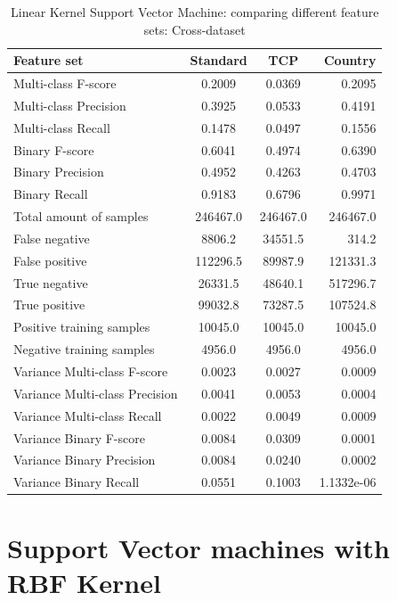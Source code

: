 \begin{table}[H]
\caption{Linear Kernel Support Vector Machine: comparing different feature sets: Cross-dataset}
\label{tab:linsvm:cross}
\centering
\begin{tabular}{l c c r}
\toprule
Feature set & Standard & TCP & Country \\
\midrule
Multi-class F-score & 0.2009 & 0.0369 & 0.2095 \\
Multi-class Precision & 0.3925 & 0.0533 & 0.4191 \\
Multi-class Recall & 0.1478 & 0.0497 & 0.1556 \\
\midrule
Binary F-score & 0.6041 & 0.4974 & 0.6390 \\
Binary Precision & 0.4952 & 0.4263 & 0.4703 \\
Binary Recall & 0.9183 & 0.6796 & 0.9971 \\
\midrule
Total amount of samples & 246467.0 & 246467.0 & 246467.0 \\
False negative & 8806.2  & 34551.5 & 314.2\\
False positive & 112296.5 & 89987.9 & 121331.3 \\
True negative & 26331.5 & 48640.1 & 517296.7 \\
True positive & 99032.8 & 73287.5 & 107524.8 \\
\midrule
Positive training samples & 10045.0 & 10045.0 & 10045.0\\
Negative training samples & 4956.0 & 4956.0 & 4956.0\\
\midrule
Variance Multi-class F-score & 0.0023 & 0.0027 & 0.0009\\
Variance Multi-class Precision & 0.0041 &  0.0053 & 0.0004\\
Variance Multi-class Recall &  0.0022 & 0.0049 &  0.0009   \\
\midrule
Variance Binary F-score & 0.0084 &  0.0309  & 0.0001 \\
Variance Binary Precision & 0.0084 &  0.0240 & 0.0002 \\
Variance Binary Recall & 0.0551 & 0.1003 & 1.1332e-06 \\
\bottomrule
\end{tabular}
\end{table}

\newpage
\section{Support Vector machines with RBF Kernel}

